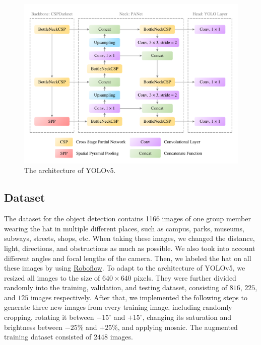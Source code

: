 \documentclass[10pt,conference,compsocconf]{IEEEtran}
\begin{document}
\begin{figure}[!ht]
	\centering
	\includegraphics[width=0.9\linewidth]{./Image/YOLOv5.pdf}
	\caption{The architecture of YOLOv5.}
    \label{fig:YOLOv5}
\end{figure}

\subsection{Dataset}
The dataset for the object detection contains 1166 images of one group member wearing the hat in multiple different places, such as campus, parks, museums, subways, streets, shops, etc.
When taking these images, we changed the distance, light, directions, and obstructions as much as possible.
We also took into account different angles and focal lengths of the camera.
Then, we labeled the hat on all these images by using \href{https://roboflow.com/}{Roboflow}.
To adapt to the architecture of YOLOv5, we resized all images to the size of $640 \times 640$ pixels.
They were further divided randomly into the training, validation, and testing dataset, consisting of $816$, $225$, and $125$ images respectively.
After that, we implemented the following steps to generate three new images from every training image, including randomly cropping, rotating it between $-15^{\circ}$ and $+15^{\circ}$, changing its saturation and brightness between $-25\%$ and $+25\%$, and applying mosaic.
The augmented training dataset consisted of $2448$ images.
\end{document}
